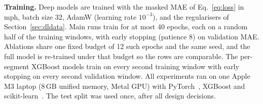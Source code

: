 \textbf{Training.} Deep models are trained with the masked MAE of
Eq.~\eqref{eq:loss} in mph, batch size 32, AdamW (learning rate $10^{-3}$), and the
regularisers of Section~\ref{sec:dldata}. Main runs train for at most 40 epochs, each
on a random half of the training windows, with early stopping (patience 8) on
validation MAE. Ablations share one fixed budget of 12 such epochs and the same seed,
and the full model is re-trained under that budget so the rows are comparable. The
per-segment XGBoost models train on every second training window with early stopping
on every second validation window. All experiments ran on one Apple M3
laptop (8\,GB unified memory, Metal GPU) with PyTorch~\cite{paszke2019}, XGBoost
and scikit-learn~\cite{pedregosa2011}. The test split was used once, after all
design decisions.
